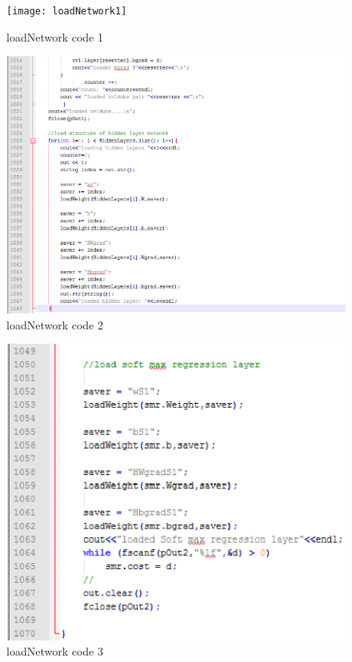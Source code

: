 \documentclass[article, onecolumn, draftclsnofoot,10pt, compsoc]{IEEEtran}
\begin{document}
\begin{figure}
  \caption{loadNetwork code 1}
  \centering
  \texttt{[image: loadNetwork1]}
\end{figure}
\begin{figure}
  \caption{loadNetwork code 2}
  \centering
  \includegraphics[width=\textwidth]{loadNetwork2}
\end{figure}
\begin{figure}
  \caption{loadNetwork code 3}
  \centering
  \includegraphics[width=\textwidth]{loadNetwork3}
\end{figure}
\end{document}
